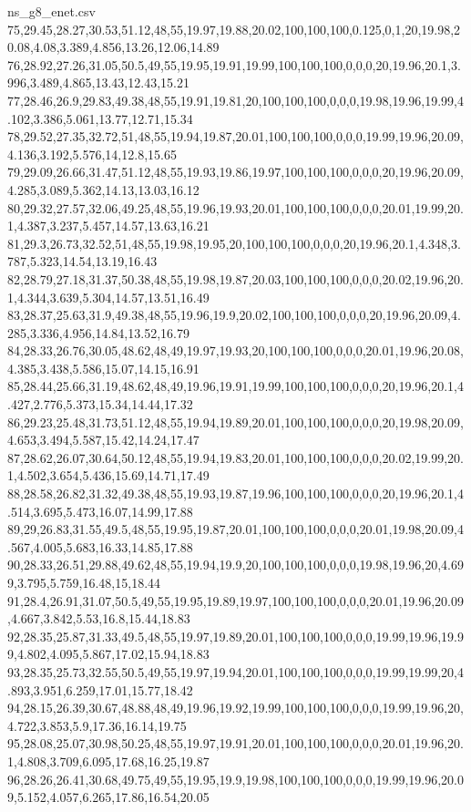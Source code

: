 \begin{filecontents*}[overwrite]{ns_g8_enet.csv}
75,29.45,28.27,30.53,51.12,48,55,19.97,19.88,20.02,100,100,100,0.125,0,1,20,19.98,20.08,4.08,3.389,4.856,13.26,12.06,14.89
76,28.92,27.26,31.05,50.5,49,55,19.95,19.91,19.99,100,100,100,0,0,0,20,19.96,20.1,3.996,3.489,4.865,13.43,12.43,15.21
77,28.46,26.9,29.83,49.38,48,55,19.91,19.81,20,100,100,100,0,0,0,19.98,19.96,19.99,4.102,3.386,5.061,13.77,12.71,15.34
78,29.52,27.35,32.72,51,48,55,19.94,19.87,20.01,100,100,100,0,0,0,19.99,19.96,20.09,4.136,3.192,5.576,14,12.8,15.65
79,29.09,26.66,31.47,51.12,48,55,19.93,19.86,19.97,100,100,100,0,0,0,20,19.96,20.09,4.285,3.089,5.362,14.13,13.03,16.12
80,29.32,27.57,32.06,49.25,48,55,19.96,19.93,20.01,100,100,100,0,0,0,20.01,19.99,20.1,4.387,3.237,5.457,14.57,13.63,16.21
81,29.3,26.73,32.52,51,48,55,19.98,19.95,20,100,100,100,0,0,0,20,19.96,20.1,4.348,3.787,5.323,14.54,13.19,16.43
82,28.79,27.18,31.37,50.38,48,55,19.98,19.87,20.03,100,100,100,0,0,0,20.02,19.96,20.1,4.344,3.639,5.304,14.57,13.51,16.49
83,28.37,25.63,31.9,49.38,48,55,19.96,19.9,20.02,100,100,100,0,0,0,20,19.96,20.09,4.285,3.336,4.956,14.84,13.52,16.79
84,28.33,26.76,30.05,48.62,48,49,19.97,19.93,20,100,100,100,0,0,0,20.01,19.96,20.08,4.385,3.438,5.586,15.07,14.15,16.91
85,28.44,25.66,31.19,48.62,48,49,19.96,19.91,19.99,100,100,100,0,0,0,20,19.96,20.1,4.427,2.776,5.373,15.34,14.44,17.32
86,29.23,25.48,31.73,51.12,48,55,19.94,19.89,20.01,100,100,100,0,0,0,20,19.98,20.09,4.653,3.494,5.587,15.42,14.24,17.47
87,28.62,26.07,30.64,50.12,48,55,19.94,19.83,20.01,100,100,100,0,0,0,20.02,19.99,20.1,4.502,3.654,5.436,15.69,14.71,17.49
88,28.58,26.82,31.32,49.38,48,55,19.93,19.87,19.96,100,100,100,0,0,0,20,19.96,20.1,4.514,3.695,5.473,16.07,14.99,17.88
89,29,26.83,31.55,49.5,48,55,19.95,19.87,20.01,100,100,100,0,0,0,20.01,19.98,20.09,4.567,4.005,5.683,16.33,14.85,17.88
90,28.33,26.51,29.88,49.62,48,55,19.94,19.9,20,100,100,100,0,0,0,19.98,19.96,20,4.699,3.795,5.759,16.48,15,18.44
91,28.4,26.91,31.07,50.5,49,55,19.95,19.89,19.97,100,100,100,0,0,0,20.01,19.96,20.09,4.667,3.842,5.53,16.8,15.44,18.83
92,28.35,25.87,31.33,49.5,48,55,19.97,19.89,20.01,100,100,100,0,0,0,19.99,19.96,19.99,4.802,4.095,5.867,17.02,15.94,18.83
93,28.35,25.73,32.55,50.5,49,55,19.97,19.94,20.01,100,100,100,0,0,0,19.99,19.99,20,4.893,3.951,6.259,17.01,15.77,18.42
94,28.15,26.39,30.67,48.88,48,49,19.96,19.92,19.99,100,100,100,0,0,0,19.99,19.96,20,4.722,3.853,5.9,17.36,16.14,19.75
95,28.08,25.07,30.98,50.25,48,55,19.97,19.91,20.01,100,100,100,0,0,0,20.01,19.96,20.1,4.808,3.709,6.095,17.68,16.25,19.87
96,28.26,26.41,30.68,49.75,49,55,19.95,19.9,19.98,100,100,100,0,0,0,19.99,19.96,20.09,5.152,4.057,6.265,17.86,16.54,20.05

\end{filecontents*}
